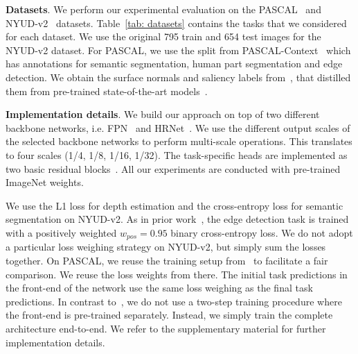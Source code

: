 \documentclass[runningheads]{llncs}
\begin{document}
\noindent\textbf{Datasets}.
We perform our experimental evaluation on the PASCAL~\cite{everingham2010pascal} and NYUD-v2~\cite{silberman2012indoor} datasets. Table~\ref{tab: datasets} contains the tasks that we considered for each dataset. We use the original 795 train and 654 test images for the NYUD-v2 dataset. For PASCAL, we use the split from PASCAL-Context~\cite{chen2014detect} which has annotations for semantic segmentation, human part segmentation and edge detection. We obtain the surface normals and saliency labels from~\cite{maninis2019attentive}, that distilled them from pre-trained state-of-the-art models~\cite{bansal2017pixelnet,chen2018encoder}. 

\noindent\textbf{Implementation details}.
\label{subsec: experiments_implementation}
We build our approach on top of two different backbone networks, i.e. FPN~\cite{lin2017feature} and HRNet~\cite{sun2019deep}. We use the different output scales of the selected backbone networks to perform multi-scale operations. This translates to four scales (1/4, 1/8, 1/16, 1/32). The task-specific heads are implemented as two basic residual blocks~\cite{he2016deep}. All our experiments are conducted with pre-trained ImageNet weights. 

We use the L1 loss for depth estimation and the cross-entropy loss for semantic segmentation on NYUD-v2. As in prior work~\cite{kokkinos2015pushing,maninis2017convolutional,maninis2019attentive}, the edge detection task is trained with a positively weighted $w_{pos} = 0.95$ binary cross-entropy loss. We do not adopt a particular loss weighing strategy on NYUD-v2, but simply sum the losses together. On PASCAL, we reuse the training setup from~\cite{maninis2019attentive} to facilitate a fair comparison. We reuse the loss weights from there. The initial task predictions in the front-end of the network use the same loss weighing as the final task predictions. In contrast to~\cite{xu2018pad,zhang2019pattern,zhang2018joint}, we do not use a two-step training procedure where the front-end is pre-trained separately. Instead, we simply train the complete architecture end-to-end. We refer to the supplementary material for further implementation details. 
\end{document}
